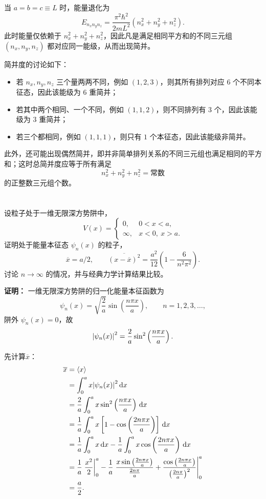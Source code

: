 \documentclass[10pt,a4paper]{article}
\begin{document}
当 $a=b=c\equiv L$ 时，能量退化为
\[
E_{n_xn_yn_z}=\frac{\pi^2\hbar^2}{2mL^2}\left( n_x^2+n_y^2+n_z^2 \right).
\]
此时能量仅依赖于 $n_x^2+n_y^2+n_z^2$，因此凡是满足相同平方和的不同三元组 $(n_x,n_y,n_z)$ 都对应同一能级，从而出现简并。

简并度的讨论如下：
\begin{itemize}
  \item 若 $n_x,n_y,n_z$ 三个量两两不同，例如 $(1,2,3)$，则其所有排列对应 $6$ 个不同本征态，因此该能级为 $6$ 重简并；
  \item 若其中两个相同、一个不同，例如 $(1,1,2)$，则不同排列有 $3$ 个，因此该能级为 $3$ 重简并；
  \item 若三个都相同，例如 $(1,1,1)$，则只有 $1$ 个本征态，因此该能级非简并。
\end{itemize}

此外，还可能出现偶然简并，即并非简单排列关系的不同三元组也满足相同的平方和；这时总简并度应等于所有满足
\[
n_x^2+n_y^2+n_z^2=\text{常数}
\]
的正整数三元组个数。

\section{}
设粒子处于一维无限深方势阱中，
\[
V(x)=
\begin{cases}
0, & 0<x<a,\\
\infty, & x<0,\ x>a.
\end{cases}
\]
证明处于能量本征态 $\psi_n(x)$ 的粒子，
\[
\overline{x}=a/2, \qquad \overline{(x-\overline{x})^2}=\frac{a^2}{12}\left(1-\frac{6}{n^2\pi^2}\right).
\]
讨论 $n\to\infty$ 的情况，并与经典力学计算结果比较。

\vspace{0.5cm}

\noindent\textbf{证明：}
一维无限深方势阱的归一化能量本征函数为
\[
\psi_n(x)=\sqrt{\frac{2}{a}}\sin\left(\frac{n\pi x}{a}\right),\qquad n=1,2,3,\dots,
\]
阱外 $\psi_n(x)=0$，故
\[
\abs{\psi_n(x)}^2=\frac{2}{a}\sin^2\left(\frac{n\pi x}{a}\right).
\]

先计算$\overline{x}$：
\begin{align*}
\overline{x}
&=\ev{x} \\
&=\int_0^a x\abs{\psi_n(x)}^2\,\dd x \\
&=\frac{2}{a}\int_0^a x\sin^2\left(\frac{n\pi x}{a}\right)\,\dd x \\
&=\frac{1}{a}\int_0^a x\left[1-\cos\left(\frac{2n\pi x}{a}\right)\right]\,\dd x \\
&=\frac{1}{a}\int_0^a x\,\dd x-\frac{1}{a}\int_0^a x\cos\left(\frac{2n\pi x}{a}\right)\,\dd x \\
&=\frac{1}{a}\eval{\frac{x^2}{2}}_0^a-\frac{1}{a}\eval{\frac{x\sin\left(\frac{2n\pi x}{a}\right)}{\frac{2n\pi}{a}}+\frac{\cos\left(\frac{2n\pi x}{a}\right)}{\left(\frac{2n\pi}{a}\right)^2}}_0^a \\
&=\frac{a}{2}.
\end{align*}
\end{document}
